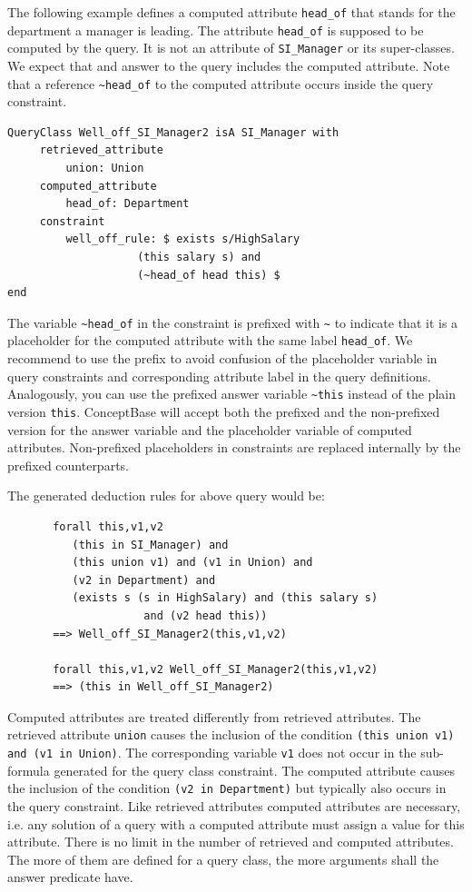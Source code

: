 The following example defines a computed attribute \verb+head_of+ that stands for
the department a manager is leading. The attribute {\tt head\_of} is
supposed to be computed by the query. It is not an attribute of
{\tt SI\_Manager} or its super-classes. We expect that and answer
to the query includes the computed attribute. Note that a reference
\verb+~head_of+  to the computed attribute occurs inside the query constraint.

{\small
\begin{verbatim}
QueryClass Well_off_SI_Manager2 isA SI_Manager with
     retrieved_attribute
         union: Union
     computed_attribute
         head_of: Department
     constraint
         well_off_rule: $ exists s/HighSalary
                    (this salary s) and
                    (~head_of head this) $
end
\end{verbatim}
}

The variable \verb+~head_of+ in the constraint
is prefixed with \verb+~+ to indicate that it is a placeholder for the computed attribute
with the same label \verb+head_of+. We recommend to
use the prefix to avoid confusion of the placeholder variable in query constraints and corresponding
attribute label in the query definitions. Analogously, you can use the prefixed answer variable
\verb+~this+ instead of the plain version \verb+this+. ConceptBase will
accept both the prefixed and the non-prefixed version for the answer variable and the
placeholder variable of computed attributes. Non-prefixed placeholders in constraints are
replaced internally by the prefixed counterparts.

The generated deduction rules for above query would be:

{\small
\begin{verbatim}
       forall this,v1,v2
          (this in SI_Manager) and
          (this union v1) and (v1 in Union) and
          (v2 in Department) and
          (exists s (s in HighSalary) and (this salary s) 
                     and (v2 head this))
       ==> Well_off_SI_Manager2(this,v1,v2)

       forall this,v1,v2 Well_off_SI_Manager2(this,v1,v2) 
       ==> (this in Well_off_SI_Manager2)
\end{verbatim}
}

Computed attributes are treated differently from retrieved attributes. The retrieved
attribute {\tt union} causes the inclusion of the condition
{\tt (this union v1) and (v1 in Union)}. The corresponding variable {\tt v1} does not occur
in the sub-formula generated for the query class constraint. The computed attribute
causes the inclusion of the condition {\tt (v2 in Department)} but typically also occurs in the
query constraint.
Like retrieved attributes computed attributes are necessary, i.e. any
solution of a query with a computed attribute must assign a value for this
attribute. 
There is no limit in the number of retrieved and computed attributes. The more of them are
defined for a query class, the more arguments shall the answer predicate have.


